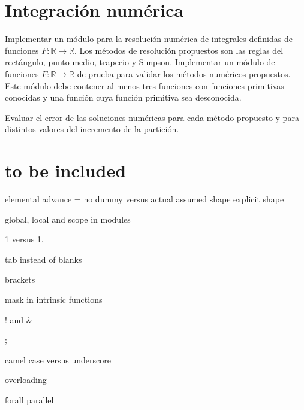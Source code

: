    
   
   
   \section{Integración numérica \label{integracion_numerica} }
   
   
   
   Implementar un módulo para la resolución numérica de integrales definidas de funciones $F:\mathbb{R} \rightarrow \mathbb{R}$.
   Los métodos de resolución propuestos son las reglas del rectángulo, punto medio, trapecio y Simpson.
   Implementar un módulo de funciones $F:\mathbb{R} \rightarrow \mathbb{R}$ de prueba para validar los métodos numéricos
   propuestos. Este módulo debe contener al menos tres funciones con funciones primitivas conocidas y una función cuya 
   función primitiva sea desconocida.
   
   Evaluar el error de las soluciones numéricas para cada método propuesto y para distintos valores del incremento de la
   partición.   
   
   
   
   
   
    
    
    
    
    \section{to be included  \label{todo} }
    elemental 
    advance = no 
    dummy versus actual 
    assumed shape explicit shape
    
    global, local and scope in modules 
    
    1 versus 1. 
    
    tab instead of blanks 
    
    brackets 
    
    mask in intrinsic functions 
    
    ! and \& 
    
    ; 
    
    camel case versus underscore 
    
    
    overloading 
    
    forall parallel 
    
